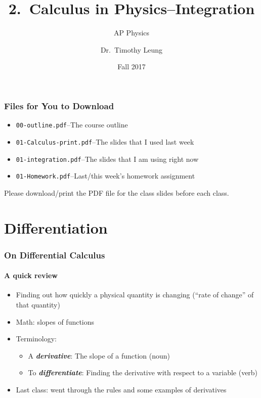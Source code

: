 \documentclass[12pt,compress,aspectratio=169]{beamer}
\title{2.\ Calculus in Physics--Integration}
\subtitle{AP Physics}
\author[TML]{Dr.\ Timothy Leung}
\institute{Olympiads School}
\date{Fall 2017}
\begin{document}
\begin{frame}
  \maketitle
\end{frame}

\begin{frame}
  \frametitle{Files for You to Download}
  \begin{itemize}
  \item\texttt{00-outline.pdf}--The course outline
  \item\texttt{01-Calculus-print.pdf}--The slides that I used last week
  \item\texttt{01-integration.pdf}--The slides that I am using right now
  \item\texttt{01-Homework.pdf}--Last/this week's homework assignment
  \end{itemize}
  Please download/print the PDF file for the class slides before each class.
\end{frame}

\section{Differentiation}

\begin{frame}
  \frametitle{On Differential Calculus}
  \framesubtitle{A quick review}
  \begin{itemize}
  \item Finding out how quickly a physical quantity is changing (``rate of
    change'' of that quantity)
  \item Math: slopes of functions
  \item Terminology:
    \begin{itemize}
    \item A \textbf{\emph{derivative}}: The slope of a function (noun)
    \item To \textbf{\emph{differentiate}}: Finding the derivative with respect
      to a variable (verb)
    \end{itemize}
  \item Last class: went through the rules and some examples of derivatives
  \end{itemize}
\end{frame}
\end{document}
